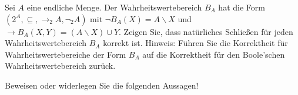 \documentclass[10pt, a4paper]{exam}
\begin{document}
\begin{questions}

    \question Sei $A$ eine endliche Menge. Der Wahrheitswertebereich $B_A$ hat die Form $(2^A,\subseteq,\rightarrow_2 A,\lnot_2 A)$ mit $\lnot B_A(X)=A\backslash X$ und $\rightarrow B_A(X,Y)=(A\backslash X)\cup Y$. Zeigen Sie, dass natürliches Schließen für jeden Wahrheitswertebereich $B_A$ korrekt ist.
    Hinweis: Führen Sie die Korrektheit für Wahrheitswertebereiche der Form $B_A$ auf die Korrektheit für den Boole’schen Wahrheitswertebereich zurück.
    \begin{solution}

    \end{solution}

    \question Beweisen oder widerlegen Sie die folgenden Aussagen!
\end{questions}
\end{document}
